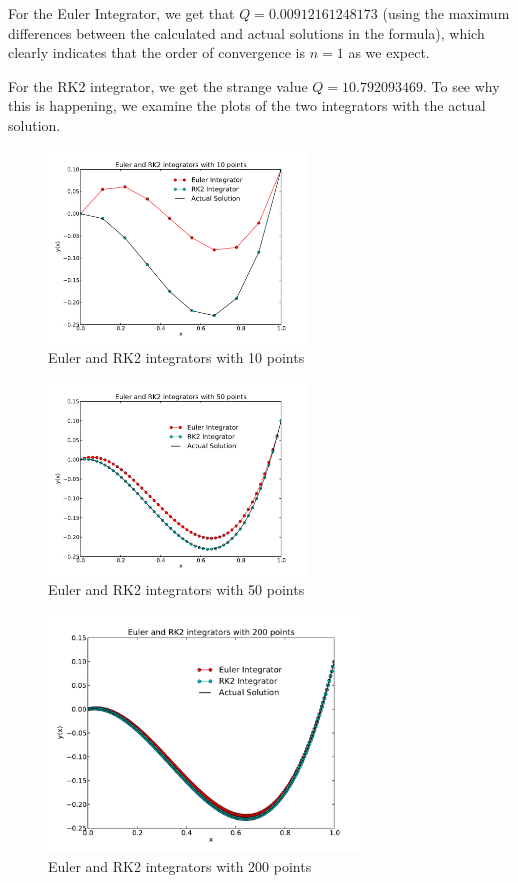 \documentclass[11pt,letterpaper]{article}
\begin{document}
For the Euler Integrator, we get that $Q = 0.00912161248173$ (using the maximum
differences between the calculated and actual solutions in the formula), which clearly
indicates that the order of convergence is $n = 1$ as we expect. 

For the RK2 integrator, we get the strange value $Q = 10.792093469$. To see why this is 
happening, we examine the plots of the two integrators with the actual solution. 

\newpage

\begin{figure}[bth]
\centering
\includegraphics[width=0.61\textwidth]{10points.pdf}
\caption{Euler and RK2 integrators with 10 points}
\label{fig:10points}
\end{figure}

\begin{figure}[bth]
\centering
\includegraphics[width=0.61\textwidth]{50points.pdf}
\caption{Euler and RK2 integrators with 50 points}
\label{fig:50points}
\end{figure}

\begin{figure}[bth]
\centering
\includegraphics[width=0.75\textwidth]{200points.pdf}
\caption{Euler and RK2 integrators with 200 points}
\label{fig:200points}
\end{figure}
\end{document}
